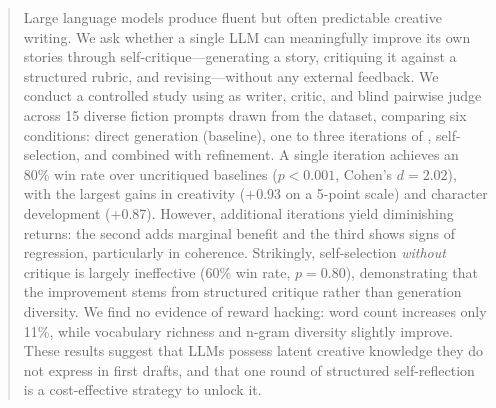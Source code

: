 \begin{abstract}
Large language models produce fluent but often predictable creative writing.
We ask whether a single LLM can meaningfully improve its own stories through self-critique---generating a story, critiquing it against a structured rubric, and revising---without any external feedback.
We conduct a controlled study using \gptfour as writer, critic, and blind pairwise judge across 15 diverse fiction prompts drawn from the \writingprompts dataset, comparing six conditions: direct generation (baseline), one to three iterations of \selfrefine, \bestofn self-selection, and \bestofn combined with refinement.
A single \critiquerevise iteration achieves an 80\% win rate over uncritiqued baselines ($p < 0.001$, Cohen's $d = 2.02$), with the largest gains in creativity (+0.93 on a 5-point scale) and character development (+0.87).
However, additional iterations yield diminishing returns: the second adds marginal benefit and the third shows signs of regression, particularly in coherence.
Strikingly, \bestofn self-selection \emph{without} critique is largely ineffective (60\% win rate, $p = 0.80$), demonstrating that the improvement stems from structured critique rather than generation diversity.
We find no evidence of reward hacking: word count increases only 11\%, while vocabulary richness and n-gram diversity slightly improve.
These results suggest that LLMs possess latent creative knowledge they do not express in first drafts, and that one round of structured self-reflection is a cost-effective strategy to unlock it.
\end{abstract}
